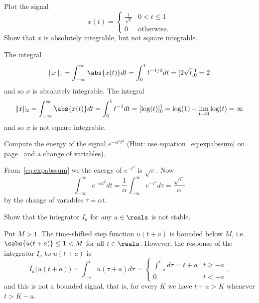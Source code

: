 \begin{excersizelist}
\item \label{excer:absintnotsquareint} Plot the signal
\[
x(t) = \begin{cases}
\frac{1}{\sqrt{t}} & 0 < t \leq 1 \\
0 & \text{otherwise}.
\end{cases}
\]
Show that $x$ is absolutely integrable, but not square integrable.
\begin{solution}
\begin{center}
\end{center}
The integral
\[
\|x\|_1 = \int_{-\infty}^\infty \abs{x(t)} dt = \int_{0}^1 t^{-1/2} dt = [2\sqrt{t}]_0^1 = 2
\]
and so $x$ is absolutely integrable.  The integral
\[
\|x\|_2 = \int_{-\infty}^\infty \abs{x(t)} dt = \int_{0}^1 t^{-1} dt = [\log(t)]_0^1 = \log(1) - \lim_{t \to 0}\log(t) = \infty
\]
and so $x$ is not square integrable.
\end{solution}

\item \label{excer:energyexpchangevar} Compute the energy of the signal $e^{-\alpha^2 t^2}$ (Hint: use equation~\eqref{eq:expabssum} on page~\pageref{eq:expabssum} and a change of variables).
\begin{solution}
From~\eqref{eq:expabssum} we the energy of $e^{-t^2}$ is $\sqrt{\pi}$.  Now
\[
\int_{-\infty}^\infty e^{-\alpha t^2} dt = \frac{1}{\alpha}\int_{-\infty}^\infty e^{-\tau^2} d\tau = \frac{\sqrt{\pi}}{\alpha}
\]
by the change of variables $\tau = \alpha t$.
\end{solution}

\item \label{excer:integratornotstable} Show that the integrator $I_a$ for any $a\in\reals$ is not  stable.
\begin{solution}
Put $M > 1$.  The time-shifted step function $u(t + a)$ is bounded below $M$, i.e. $\sabs{u(t+a)} \leq 1 < M$ for all $t \in \reals$.  However, the response of the integrator $I_a$ to $u(t+a)$ is
\[
I_a\big(u(t+a)\big) = \int_{-a}^t u(\tau + a)d\tau = \begin{cases}
\int_{-a}^t d\tau = t + a & t \geq -a \\
0 & t < -a 
\end{cases},
\]
and this is not a bounded signal, that is, for every $K$ we have $t + a > K$ whenever $t > K - a$.
\end{solution}


\end{excersizelist}

